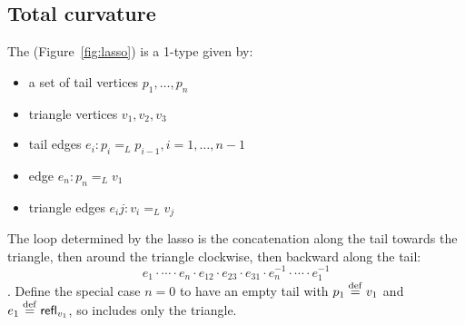 \subsection{Total curvature}
\begin{mydef}
The  (Figure~\ref{fig:lasso}) is a 1-type given by:
\begin{itemize}
\item a set of tail vertices \( p_1,\ldots,p_n \)
\item triangle vertices \( v_1, v_2, v_3 \)
\item tail edges \( e_i:p_i=_L p_{i-1}, i=1,\ldots,n-1 \)
\item edge \( e_n:p_n=_L v_1 \)
\item triangle edges \( e_ij:v_i=_L v_j \)
\end{itemize}
The loop determined by the lasso is the concatenation along the tail towards the triangle, then around the triangle clockwise, then backward along the tail:\[ e_1\cdot\cdots\cdot e_n\cdot e_{12}\cdot e_{23} \cdot e_{31}\cdot e_n^{-1}\cdot\cdots\cdot e_1^{-1} \].
Define the special case \( n=0 \) to have an empty tail with \( p_1\stackrel{\mathrm{def}}{=} v_1 \) and \( e_1\stackrel{\mathrm{def}}{=}\mathsf{refl}_{v_1} \), so includes only the triangle.
\end{mydef}
